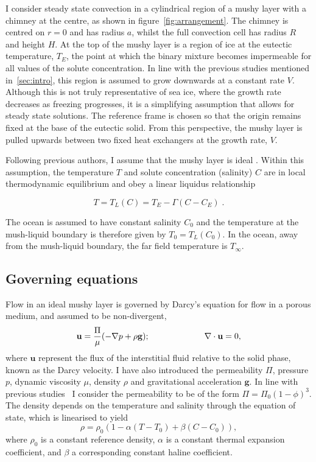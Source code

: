 \documentclass[11pt]{proc}
\begin{document}
I consider steady state convection in a cylindrical region of a mushy layer with a chimney at the centre, as shown in figure~\ref{fig:arrangement}. The chimney is centred on $r=0$ and has radius $a$, whilst the full convection cell has radius $R$ and height $H$. At the top of the mushy layer is a region of ice at the eutectic temperature, $T_E$, the point at which the binary mixture becomes impermeable for all values of the solute concentration. In line with the previous studies mentioned in~\autoref{sec:intro}, this region is assumed to grow downwards at a constant rate $V$. Although this is not truly representative of sea ice, where the growth rate decreases as freezing progresses, it is a simplifying assumption that allows for steady state solutions. The reference frame is chosen so that the origin remains fixed at the base of the eutectic solid. From this perspective, the mushy layer is pulled upwards between two fixed heat exchangers at the growth rate, $V$.

Following previous authors, I assume that the mushy layer is ideal \citep*{worster-97}. Within this assumption, the temperature $T$ and solute concentration (salinity) $C$ are in local thermodynamic equilibrium and obey a linear liquidus relationship

\begin{equation}
\label{eq:liquidus}
T = T_L(C) = T_E  - \Gamma (C-C_E) \; .
\end{equation}

 The ocean is assumed to have constant salinity $C_0$ and the temperature at the mush-liquid boundary is therefore given by $T_0 = T_L(C_0)$. In the ocean, away from the mush-liquid boundary, the far field temperature is $T_\infty$.

\subsection{Governing equations}
Flow in an ideal mushy layer is governed by Darcy's equation for flow in a porous medium, and assumed to be non-divergent,
\begin{equation}
\label{eq:darcys-eqn}
 \mathbf{u} = \frac{\Pi}{\mu} (- \nabla p + \rho \mathbf{g}); \hspace{15ex} \nabla \cdot \mathbf{u} = 0,
\end{equation}
where $\mathbf{u}$ represent the flux of the interstitial fluid relative to the solid phase, known as the Darcy velocity. I have also introduced the permeability $\Pi$, pressure $p$, dynamic viscosity $\mu$, density $\rho$ and gravitational acceleration $\mathbf{g}$. In line with previous studies~\citep*{schulze-worster-98,chung-worster-02} I consider the permeability to be of the form $\Pi = \Pi_0 (1-\phi)^3$.  The density depends on the temperature and salinity through the equation of state, which is linearised to yield
\begin{equation}
\rho = \rho_0 (1-\alpha (T-T_0) + \beta (C-C_0)),
\end{equation}
where $\rho_0$ is a constant reference density, $\alpha$ is a constant thermal expansion coefficient, and $\beta$ a corresponding constant haline coefficient.
\end{document}

